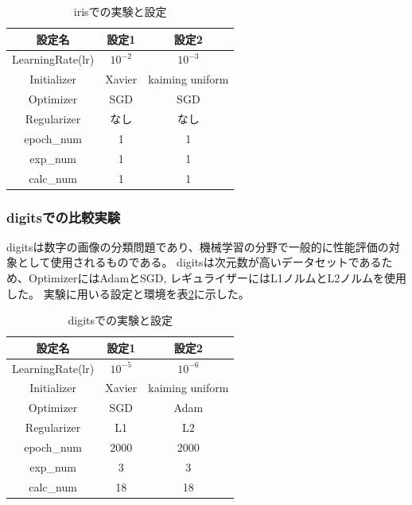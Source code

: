 \begin{table}[htbp]
\label{exp:iris}
    \begin{center}
        \caption{irisでの実験と設定}
        \label{exp:iris}
        \vspace{2mm} 
        \begin{tabular}{ |c|c|c| }
        設定名 & 設定1 & 設定2 \\
        \hline
        LearningRate(lr)         & $ 10^{-2} $ & $ 10^{-3} $ \\
        Initializer       & Xavier &  kaiming uniform \\
        Optimizer           & SGD & SGD \\
        Regularizer     & なし & なし \\
        epoch\_num       & 1 &  1 \\
        exp\_num         & 1 & 1 \\
        calc\_num        & 1 & 1 \\
        \end{tabular}
    \end{center}
\end{table}



\subsubsection{digitsでの比較実験}
\label{impl:digits}

digitsは数字の画像の分類問題であり、機械学習の分野で一般的に性能評価の対象として使用されるものである。
digitsは次元数が高いデータセットであるため、OptimizerにはAdamとSGD, レギュライザーにはL1ノルムとL2ノルムを使用した。
実験に用いる設定と環境を表\ref{exp:digits}に示した。

\begin{table}[htbp]
    \begin{center}
        \caption{digitsでの実験と設定}
        \label{exp:digits}
        \vspace{2mm} 
        \begin{tabular}{ |c|c|c| }
        設定名 & 設定1 & 設定2 \\
        \hline
        LearningRate(lr)         & $ 10^{-5} $ & $ 10^{-6} $ \\
        Initializer       & Xavier & kaiming uniform \\
        Optimizer           & SGD & Adam \\
        Regularizer     & L1 & L2 \\
        epoch\_num       & 2000 &  2000 \\
        exp\_num         & 3 & 3 \\
        calc\_num        & 18 & 18 \\
        \end{tabular}
    \end{center}
\end{table}




